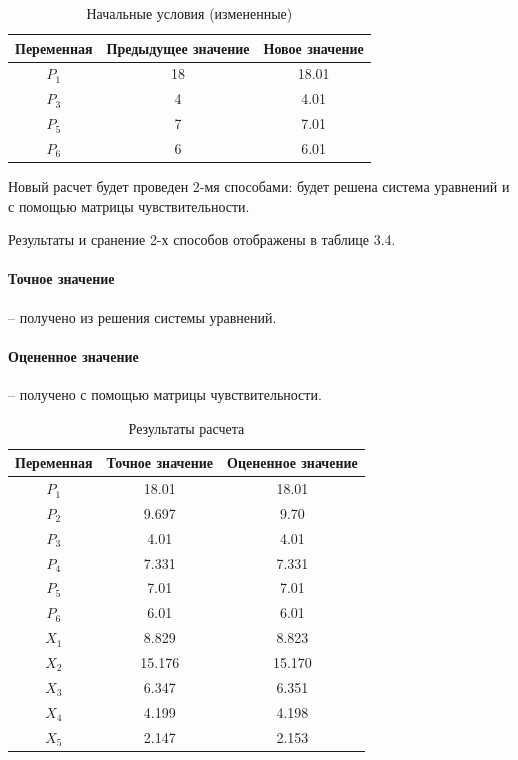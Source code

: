 \begin{table}[h!]
  \centering
    \begin{tabular}{| c | c | c |}
    \hline
    Переменная & Предыдущее значение & Новое значение \\ \hline
    $ P_1 $ & 18 & 18.01 \\ \hline
    $ P_3 $ & 4 & 4.01 \\ \hline
    $ P_5 $ & 7 & 7.01 \\ \hline
    $ P_6 $ & 6 & 6.01 \\ \hline

    \end{tabular}
  \caption{Начальные условия (измененные)}
\end{table}

Новый расчет будет проведен 2-мя способами: будет решена система уравнений и с помощью матрицы чувствительности.

Результаты и сранение 2-х способов отображены в таблице 3.4.

\paragraph{Точное значение} -- получено из решения системы уравнений.

\paragraph{Оцененное значение} -- получено с помощью матрицы чувствительности.

\begin{table}[h!]
  \centering
    \begin{tabular}{| c | c | c |}
    \hline
    Переменная & Точное значение & Оцененное значение \\ \hline
    $ P_1 $ & 18.01 & 18.01 \\ \hline
    $ P_2 $ & 9.697 & 9.70 \\ \hline
    $ P_3 $ & 4.01 & 4.01 \\ \hline
    $ P_4 $ & 7.331 & 7.331 \\ \hline
    $ P_5 $ & 7.01 & 7.01 \\ \hline
    $ P_6 $ & 6.01 & 6.01 \\ \hline
    $ X_1 $ & 8.829 & 8.823 \\ \hline
    $ X_2 $ & 15.176 & 15.170 \\ \hline
    $ X_3 $ & 6.347 & 6.351 \\ \hline
    $ X_4 $ & 4.199 & 4.198 \\ \hline
    $ X_5 $ & 2.147 & 2.153 \\ \hline

    \end{tabular}
  \caption{Результаты расчета}
\end{table}

